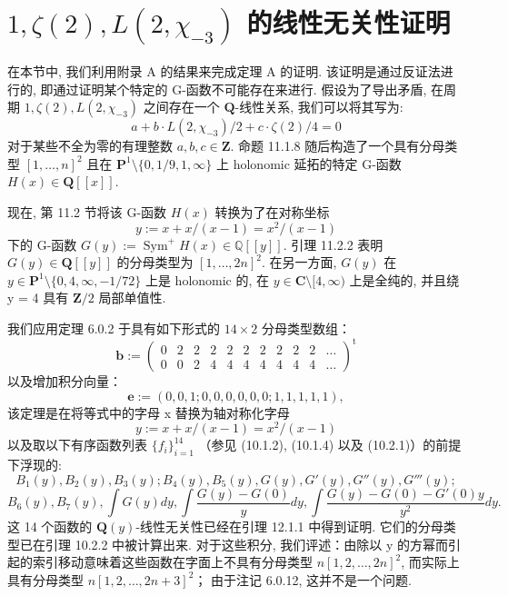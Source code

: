 \section{\texorpdfstring{$1, \zeta(2), L(2, \chi_{-3})$}{1, \textbackslash{}zeta(2), L(2, \textbackslash{}chi\_\{-3\})} 的线性无关性证明}\label{sec:13}

在本节中, 我们利用附录 A 的结果来完成定理 A 的证明. 
该证明是通过反证法进行的, 即通过证明某个特定的 G-函数不可能存在来进行. 
假设为了导出矛盾, 在周期 \(1, \zeta(2), L(2, \chi_{-3})\) 之间存在一个 \(\mathbf{Q}\)-线性关系, 
我们可以将其写为:
\begin{equation}\label{eq:13.0.1}
a + b \cdot L(2, \chi_{-3})/2 + c \cdot \zeta(2)/4 = 0
\end{equation}
对于某些不全为零的有理整数 \(a, b, c \in \mathbf{Z}\). 
命题 11.1.8 随后构造了一个具有分母类型 \([1,\dots,n]^2\) 
且在 \(\mathbf{P}^1 \setminus \{0,1/9,1,\infty\}\) 上 holonomic 延拓的特定 G-函数 \(H(x) \in \mathbf{Q}[\![x]\!]\).

现在, 第 11.2 节将该 G-函数 \(H(x)\) 转换为了在对称坐标
\[ y := x + x/(x - 1) = x^2/(x - 1) \]
下的 G-函数 \(G(y) := \operatorname{Sym}^+ H(x) \in \mathbb{Q}[\![y]\!]\). 
引理 11.2.2 表明 \(G(y) \in \mathbf{Q}[\![y]\!]\) 的分母类型为 \([1,\dots,2n]^2\). 
在另一方面, \(G(y)\) 在 \(y \in \mathbf{P}^1 \setminus \{0,4,\infty,-1/72\}\) 上是 holonomic 的, 
在 \(y \in \mathbf{C} \setminus [4,\infty)\) 上是全纯的, 
并且绕 y = 4 具有 \(\mathbf{Z}/2\) 局部单值性.

我们应用定理 6.0.2 于具有如下形式的 \(14 \times 2\) 分母类型数组：
\begin{equation}\label{eq:13.0.2}
\mathbf{b} := \begin{pmatrix} 
0 & 2 & 2 & 2 & 2 & 2 & 2 & 2 & 2 & 2 & \dots \\ 
0 & 0 & 2 & 4 & 4 & 4 & 4 & 4 & 4 & 4 & \dots
\end{pmatrix}^{\mathrm{t}}
\end{equation}
以及增加积分向量：
\[ \mathbf{e} := (0, 0, 1; 0, 0, 0, 0, 0, 0; 1, 1, 1, 1, 1), \]
该定理是在将等式中的字母 x 替换为轴对称化字母
\[ y := x + x/(x-1) = x^2/(x-1) \]
以及取以下有序函数列表 \(\{f_i\}_{i=1}^{14}\) （参见 (10.1.2), (10.1.4) 以及 (10.2.1)）的前提下浮现的:
\[ B_1(y), B_2(y), B_3(y); B_4(y), B_5(y), G(y), G'(y), G''(y), G'''(y); \]
\[ B_6(y), B_7(y), \int G(y) dy, \int \frac{G(y) - G(0)}{y} dy, \int \frac{G(y) - G(0) - G'(0)y}{y^2} dy. \]
这 14 个函数的 \(\mathbf{Q}(y)\)-线性无关性已经在引理 12.1.1 中得到证明. 
它们的分母类型已在引理 10.2.2 中被计算出来. 
对于这些积分, 我们评述：由除以 y 的方幂而引起的索引移动意味着这些函数在字面上不具有分母类型 \(n[1, 2, \ldots, 2n]^2\), 
而实际上具有分母类型 \(n[1, 2, \ldots, 2n + 3]^2\)； 
由于注记 6.0.12, 这并不是一个问题.

